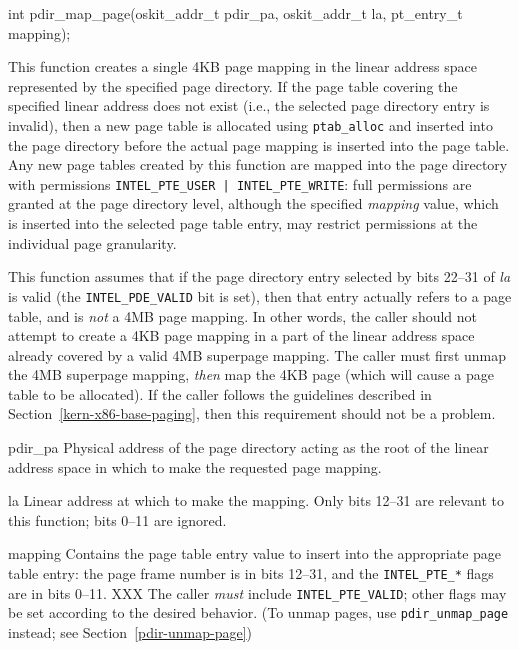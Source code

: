 \label{pdir-map-page}
\begin{apisyn}

	\funcproto int pdir_map_page(oskit_addr_t pdir_pa, oskit_addr_t la,
				     pt_entry_t mapping);
\end{apisyn}
\begin{apidesc}
	This function creates a single 4KB page mapping
	in the linear address space represented by the specified page directory.
	If the page table covering the specified linear address does not exist
	(i.e., the selected page directory entry is invalid),
	then a new page table is allocated using {\tt ptab_alloc}
	and inserted into the page directory
	before the actual page mapping is inserted into the page table.
	Any new page tables created by this function
	are mapped into the page directory with permissions
	{\tt INTEL_PTE_USER | INTEL_PTE_WRITE}:
	full permissions are granted at the page directory level,
	although the specified \emph{mapping} value,
	which is inserted into the selected page table entry,
	may restrict permissions at the individual page granularity.

	This function assumes that
	if the page directory entry selected by bits 22--31 of \emph{la}
	is valid (the {\tt INTEL_PDE_VALID} bit is set),
	then that entry actually refers to a page table,
	and is \emph{not} a 4MB page mapping.
	In other words,
	the caller should not attempt to create a 4KB page mapping
	in a part of the linear address space
	already covered by a valid 4MB superpage mapping.
	The caller must first unmap the 4MB superpage mapping,
	\emph{then} map the 4KB page
	(which will cause a page table to be allocated).
	If the caller follows the guidelines
	described in Section~\ref{kern-x86-base-paging},
	then this requirement should not be a problem.
\end{apidesc}
\begin{apiparm}
	\item[pdir_pa]
		Physical address of the page directory
		acting as the root of the linear address space
		in which to make the requested page mapping.
	\item[la]
		Linear address at which to make the mapping.
		Only bits 12--31 are relevant to this function;
		bits 0--11 are ignored.
	\item[mapping]
		Contains the page table entry value
		to insert into the appropriate page table entry:
		the page frame number is in bits 12--31,
		and the {\tt INTEL_PTE_*} flags are in bits 0--11.
		XXX The caller \emph{must} include {\tt INTEL_PTE_VALID};
		other flags may be set according to the desired behavior.
		(To unmap pages, use {\tt pdir_unmap_page} instead;
		see Section~\ref{pdir-unmap-page})
\end{apiparm}
